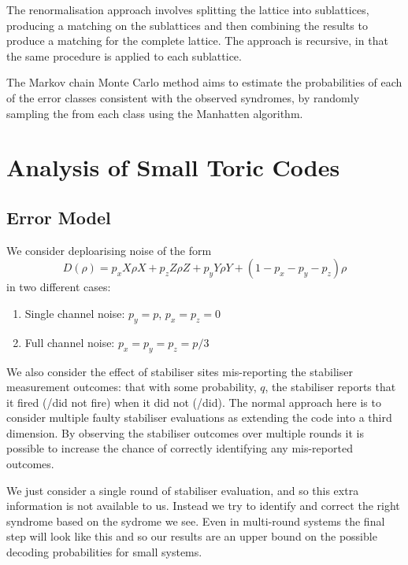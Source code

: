 The renormalisation approach involves splitting the lattice into sublattices, producing a matching on the sublattices and then combining the results to produce a matching for the complete lattice. The approach is recursive, in that the same procedure is applied to each sublattice. 

The Markov chain Monte Carlo method aims to estimate the probabilities of each of the error classes consistent with the observed syndromes, by randomly sampling the from each class using the Manhatten algorithm. 



\section{Analysis of Small Toric Codes}


\subsection{Error Model}

We consider deploarising noise of the form
\begin{equation} \label{noise_eq}
  D(\rho) = p_x X\rho X +  p_z Z\rho Z + p_y Y\rho Y  + (1- p_x - p_y - p_z)\rho
\end{equation}
in two different cases:
\begin{enumerate}
  \item Single channel noise: $p_y = p$, $p_x = p_z = 0$
  \item Full channel noise: $p_x = p_y = p_z = p/3$
\end{enumerate}

We also consider the effect of stabiliser sites mis-reporting the stabiliser measurement outcomes: that with some probability, $q$, the stabiliser reports that it fired (/did not fire) when it did not (/did). The normal approach here is to consider multiple faulty stabiliser evaluations as extending the code into a third dimension. By observing the stabiliser outcomes over multiple rounds it is possible to increase the chance of correctly identifying any mis-reported outcomes.

We just consider a single round of stabiliser evaluation, and so this extra information is not available to us. Instead we try to identify and correct the right syndrome based on the sydrome we see. Even in multi-round systems the final step will look like this and so our results are an upper bound on the possible decoding probabilities for small systems.

